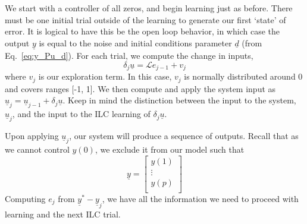 We start with a controller of all zeros, and begin learning just as before. There must be one initial trial outside of the learning to generate our first `state' of error. It is logical to have this be the open loop behavior, in which case the output $\underline{y}$ is equal to the noise and initial conditions parameter $\underline{d}$ (from Eq.~\ref{eq:y_Pu_d}). For each trial, we compute the change in inputs,
\begin{equation}
    \delta_j\underline{u}=\mathcal{L}e_{j-1}+v_j
    \label{eq:rl_ilc_input}
\end{equation}
where $v_j$ is our exploration term. In this case, $v_j$ is normally distributed around 0 and covers ranges [-1, 1]. We then compute and apply the system input as ${\underline{u}}_j={\underline{u}}_{j-1}+\delta_j\underline{u}$. Keep in mind the distinction between the input to the system, ${\underline{u}}_j$, and the input to the ILC learning of $\delta_j\underline{u}$.

Upon applying ${\underline{u}}_j$, our system will produce a sequence of outputs. Recall that as we cannot control $y\left(0\right)$, we exclude it from our model such that
\begin{equation}
    \underline{y}=\left[\begin{matrix}y\left(1\right)\\\vdots\\y\left(p\right)\\\end{matrix}\right]
\end{equation}
Computing $e_j$ from ${\underline{y}}^\ast-{\underline{y}}_j$, we have all the information we need to proceed with learning and the next ILC trial.

